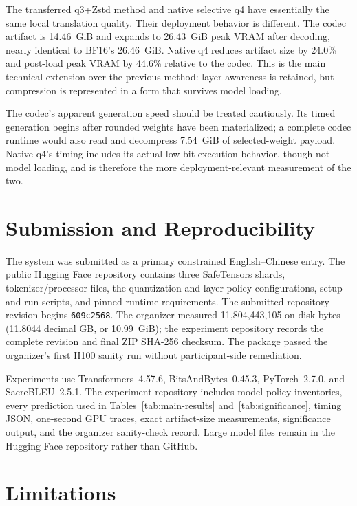 \documentclass[11pt]{article}
\begin{document}
The transferred q3+Zstd method and native selective q4 have essentially the same local translation quality. Their deployment behavior is different. The codec artifact is 14.46~GiB and expands to 26.43~GiB peak VRAM after decoding, nearly identical to BF16's 26.46~GiB. Native q4 reduces artifact size by 24.0\% and post-load peak VRAM by 44.6\% relative to the codec. This is the main technical extension over the previous method: layer awareness is retained, but compression is represented in a form that survives model loading.

The codec's apparent generation speed should be treated cautiously. Its timed generation begins after rounded weights have been materialized; a complete codec runtime would also read and decompress 7.54~GiB of selected-weight payload. Native q4's timing includes its actual low-bit execution behavior, though not model loading, and is therefore the more deployment-relevant measurement of the two.

\section{Submission and Reproducibility}

The system was submitted as a primary constrained English--Chinese entry. The public Hugging Face repository contains three SafeTensors shards, tokenizer/processor files, the quantization and layer-policy configurations, setup and run scripts, and pinned runtime requirements. The submitted repository revision begins \texttt{609c2568}. The organizer measured 11,804,443,105 on-disk bytes (11.8044 decimal GB, or 10.99~GiB); the experiment repository records the complete revision and final ZIP SHA-256 checksum. The package passed the organizer's first H100 sanity run without participant-side remediation.

Experiments use Transformers~4.57.6, BitsAndBytes~0.45.3, PyTorch~2.7.0, and SacreBLEU~2.5.1. The experiment repository includes model-policy inventories, every prediction used in Tables~\ref{tab:main-results} and~\ref{tab:significance}, timing JSON, one-second GPU traces, exact artifact-size measurements, significance output, and the organizer sanity-check record. Large model files remain in the Hugging Face repository rather than GitHub.

\section{Limitations}
\end{document}
